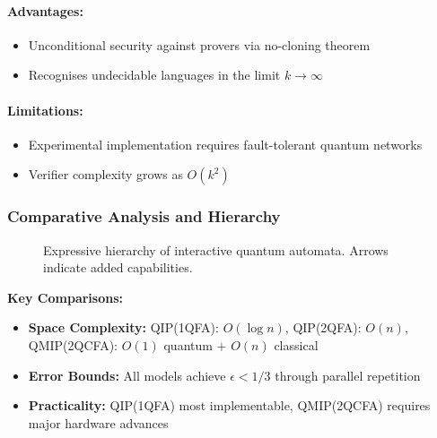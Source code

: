 \paragraph{Advantages:}
\begin{itemize}
    \item Unconditional security against provers via no-cloning theorem
    \item Recognises undecidable languages in the limit $k \rightarrow \infty$
\end{itemize}

\paragraph{Limitations:}
\begin{itemize}
    \item Experimental implementation requires fault-tolerant quantum networks
    \item Verifier complexity grows as $O(k^2)$
\end{itemize}

\subsubsection*{Comparative Analysis and Hierarchy}
\begin{figure}[h]
\centering
{}

\caption{Expressive hierarchy of interactive quantum automata. Arrows indicate added capabilities.}
\label{fig:interactive-hierarchy}
\end{figure}

\textbf{Key Comparisons:}
\begin{itemize}
    \item \textbf{Space Complexity:} QIP(1QFA): $O(\log n)$, QIP(2QFA): $O(n)$, QMIP(2QCFA): $O(1)$ quantum + $O(n)$ classical
    \item \textbf{Error Bounds:} All models achieve $\epsilon < 1/3$ through parallel repetition
    \item \textbf{Practicality:} QIP(1QFA) most implementable, QMIP(2QCFA) requires major hardware advances
\end{itemize}